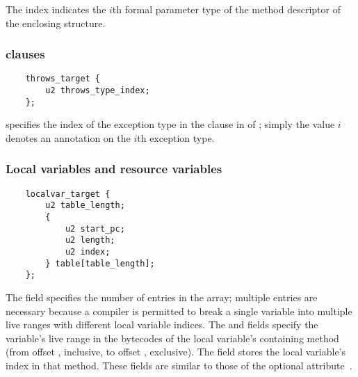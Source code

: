 \documentclass[10pt]{article}
\begin{document}
The index indicates the $i$th formal parameter type of the method
descriptor of the enclosing  structure.



\subsubsection{ clauses\label{class-file:ext:ri:throws}}


\preverbnegspace
\begin{Verbatim}
    throws_target {
        u2 throws_type_index;
    };
\end{Verbatim}

 specifies the index of the exception type in the
clause in  of ;
simply the value $i$ denotes an annotation on the $i$th exception
type.



\subsubsection{Local variables and resource variables\label{class-file:ext:ri:localvar}}


\preverbnegspace
\begin{Verbatim}
    localvar_target {
        u2 table_length;
        {
            u2 start_pc;
            u2 length;
            u2 index;
        } table[table_length];
    };
\end{Verbatim}

The  field specifies the number of entries in the
 array; multiple entries are necessary because a compiler is
permitted to break a single variable into multiple live ranges with different
local variable indices.
The  and  fields specify the variable's
live range in the bytecodes of the local variable's containing method
(from offset , inclusive, to offset , exclusive).  The
 field stores the local variable's index in that method.
These fields are similar to those of the optional
 attribute~\cite[\S 4.8.12]{LindholmYBB2012}.
\end{document}

